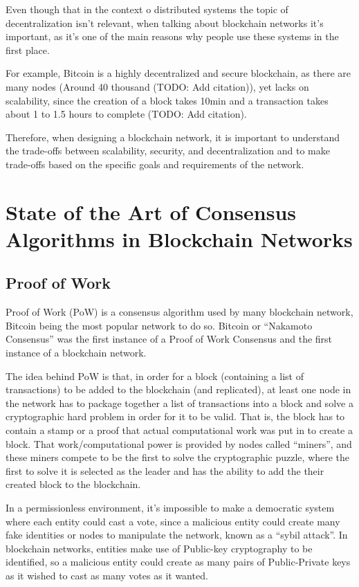 Even though that in the context o distributed systems the topic of decentralization isn't relevant, when talking about blockchain networks it's important, as it's one of the main reasons why people use these systems in the first place.

For example, Bitcoin is a highly decentralized and secure blockchain, as there are many nodes (Around 40 thousand (TODO: Add citation)), yet lacks on scalability, since the creation of a block takes 10min and a transaction takes about 1 to 1.5 hours to complete (TODO: Add citation).

Therefore, when designing a blockchain network, it is important to understand the trade-offs between scalability, security, and decentralization and to make trade-offs based on the specific goals and requirements of the network.



\section{State of the Art of Consensus Algorithms in Blockchain Networks}


\subsection{\textbf{Proof of Work}}
Proof of Work (PoW) is a consensus algorithm used by many blockchain network, Bitcoin being the most popular network to do so.
Bitcoin or ``Nakamoto Consensus'' was the first instance of a Proof of Work Consensus and the first instance of a blockchain network.

The idea behind PoW is that, in order for a block (containing a list of transactions) to be added to the blockchain (and replicated), at least one node in the network has to package together a list of transactions into a block and solve a cryptographic hard problem in order for it to be valid.
That is, the block has to contain a stamp or a proof that actual computational work was put in to create a block.
That work/computational power is provided by nodes called ``miners'', and these miners compete to be the first to solve the cryptographic puzzle, where the first to solve it is selected as the leader and has the ability to add the their created block to the blockchain.

In a permissionless environment, it's impossible to make a democratic system where each entity could cast a vote, since a malicious entity could create many fake identities or nodes to manipulate the network, known as a ``sybil attack''.
In blockchain networks, entities make use of Public-key cryptography to be identified, so a malicious entity could create as many pairs of Public-Private keys as it wished to cast as many votes as it wanted.

